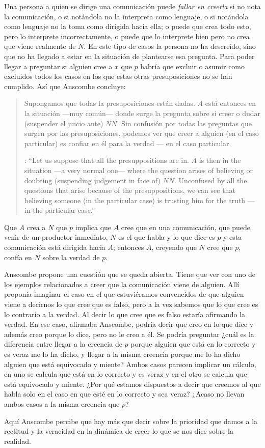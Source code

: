 Una persona a quien se dirige una comunicación puede \emph{fallar en creerla} si no nota la comunicación, o si notándola no la interpreta como lenguaje, o si notándola como lenguaje no la toma como dirigida hacia ella; o puede que crea todo esto, pero lo interprete incorrectamente, o puede que lo interprete bien pero no crea que viene realmente de $N$. En este tipo de casos la persona no ha descreído, sino que no ha llegado a estar en la situación de plantearse esa pregunta. Para poder llegar a preguntar si alguien cree a $x$ que $p$ habría que excluir o asumir como excluidos todos los casos en los que estas otras presuposiciones no se han cumplido. Así que Anscombe concluye: \blockquote[{\cite[9]{anscombe2008faith:tobelieve}}: \enquote{Let us suppose that all the presuppositions are in. $A$ is then in the situation ---a very normal one--- where the question arises of believing or doubting (suspending judgement in face of) $NN$. Unconfused by all the questions that arise because of the presuppositions, we can see that believing someone (in the particular case) is trusting him for the truth --- in the particular case.}]{Supongamos que todas la presuposiciones están dadas. $A$ está entonces en la situación ---muy común--- donde surge la pregunta sobre si creer o dudar (suspender el juicio ante) $NN$. Sin confusión por todas las preguntas que surgen por las presuposiciones, podemos ver que creer a alguien (en el caso particular) es confiar en él para la verdad --- en el caso particular.} Que $A$ crea a $N$ que $p$ implica que $A$ cree que en una comunicación, que puede venir de un productor inmediato, $N$ es el que habla y lo que dice es $p$ y esta comunicación está dirigida hacia $A$; entonces $A$, creyendo que $N$ cree que $p$, confía en $N$ sobre la verdad de $p$.

Anscombe propone una cuestión que se queda abierta. Tiene que ver con uno de los ejemplos relacionados a creer que la comunicación viene de alguien. Allí proponía imaginar el caso en el que estuviéramos convencidos de que alguien viene a decirnos lo que cree que es falso, pero a la vez sabemos que lo que cree es lo contrario a la verdad. Al decir lo que cree que es falso estaría afirmando la verdad. En ese caso, afirmaba Anscombe, podría decir que creo en lo que dice y además creo porque lo dice, pero no le creo a él. Se podría preguntar ¿cuál es la diferencia entre llegar a la creencia de $p$ porque alguien que está en lo correcto y es veraz me lo ha dicho, y llegar a la misma creencia porque me lo ha dicho alguien que está equivocado y miente? Ambos casos parecen implicar un cálculo, en uno se calcula que está en lo correcto y es veraz y en el otro se calcula que está equivocado y miente. ¿Por qué estamos dispuestos a decir que creemos al que habla solo en el caso en que esté en lo correcto y sea veraz? ¿Acaso no llevan ambos casos a la misma creencia que $p$?

Aquí Anscombe percibe que hay más que decir sobre la prioridad que damos a la rectitud y la veracidad en la dinámica de creer lo que se nos dice sobre la realidad.
